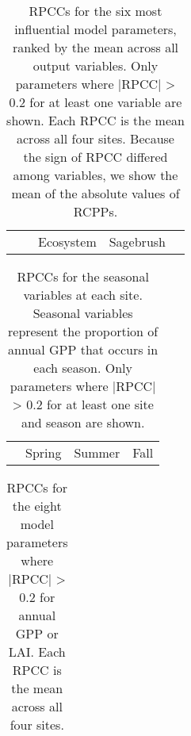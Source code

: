 \documentclass[]{article}
\begin{document}
\begin{table}[ht]
	\begin{threeparttable} %
	\caption{RPCCs for the six most influential model parameters, ranked by the mean across all output variables. Only parameters where |RPCC| > 0.2 for at least one variable are shown. Each RPCC is the mean across all four sites. Because the sign of RPCC differed among variables, we show the mean of the absolute values of RCPPs.} 
	\begin{tabular}{lrrrrrrrr}
		\toprule
		&& \multicolumn{2}{c}{Ecosystem} & \multicolumn{4}{c}{Sagebrush} \\
		\cmidrule(lr){3-4} \cmidrule(lr){5-8}
		
	\end{tabular}
\end{threeparttable}
\end{table}

\begin{table}[ht]
	\begin{threeparttable}
	\caption{RPCCs for the seasonal variables at each site. Seasonal variables represent the proportion of annual GPP that occurs in each season. Only parameters where |RPCC| > 0.2 for at least one site and season are shown.} 
	\begin{tabularx}{\textwidth}{lrrrrrrrrrrrr}
		\toprule
		& \multicolumn{4}{c}{Spring} & \multicolumn{4}{c}{Summer} & \multicolumn{4}{c}{Fall} \\
		\cmidrule(lr){2-5} \cmidrule(lr){6-9} \cmidrule(lr){10-13}
		
	\end{tabularx}
\end{threeparttable}
\end{table}

\begin{table}[ht]
	\begin{threeparttable}
	\caption{RPCCs for the eight model parameters where |RPCC| > 0.2 for annual GPP or LAI. Each RPCC is the mean across all four sites.} 
	\begin{tabular}{lrr}
		\toprule
		
	\end{tabular}
\end{threeparttable}
\end{table}
\end{document}
